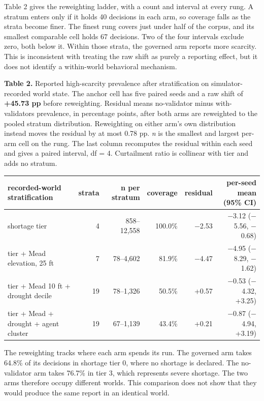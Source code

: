 \documentclass{article}
\begin{document}
Table 2 gives the reweighting ladder, with a count and interval at every rung. A stratum enters only if it holds 40 decisions in each arm, so coverage falls as the strata become finer. The finest rung covers just under half of the corpus, and its smallest comparable cell holds 67 decisions. Two of the four intervals exclude zero, both below it. Within those strata, the governed arm reports more scarcity. This is inconsistent with treating the raw shift as purely a reporting effect, but it does not identify a within-world behavioral mechanism.

\textbf{Table 2.} Reported high-scarcity prevalence after stratification on simulator-recorded world state. The anchor cell has five paired seeds and a raw shift of \textbf{+45.73 pp} before reweighting. Residual means no-validator minus with-validators prevalence, in percentage points, after both arms are reweighted to the pooled stratum distribution. Reweighting on either arm's own distribution instead moves the residual by at most 0.78 pp. \textit{n} is the smallest and largest per-arm cell on the rung. The last column recomputes the residual within each seed and gives a paired interval, df = 4. Curtailment ratio is collinear with tier and adds no stratum.

\begin{center}
\small
\setlength{\tabcolsep}{3pt}
\begin{tabular}{lrrrrr}
\hline
recorded-world stratification & strata & n per stratum & coverage & residual & per-seed mean (95\% CI) \\
\hline
shortage tier & 4 & 858--12,558 & 100.0\% & $-$2.53 & $-$3.12 ($-$5.56, $-$0.68) \\
tier + Mead elevation, 25 ft & 7 & 78--4,602 & 81.9\% & $-$4.47 & $-$4.95 ($-$8.29, $-$1.62) \\
tier + Mead 10 ft + drought decile & 19 & 78--1,326 & 50.5\% & +0.57 & $-$0.53 ($-$4.32, +3.25) \\
tier + Mead + drought + agent cluster & 19 & 67--1,139 & 43.4\% & +0.21 & $-$0.87 ($-$4.94, +3.19) \\
\hline
\end{tabular}
\end{center}

The reweighting tracks where each arm spends its run. The governed arm takes 64.8\% of its decisions in shortage tier 0, where no shortage is declared. The no-validator arm takes 76.7\% in tier 3, which represents severe shortage. The two arms therefore occupy different worlds. This comparison does not show that they would produce the same report in an identical world.
\end{document}
